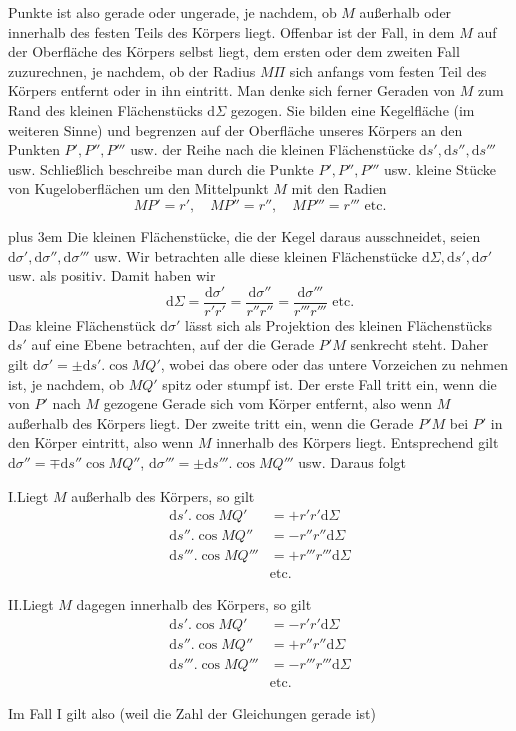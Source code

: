 Punkte ist also gerade oder ungerade, je nachdem, ob $M$ außerhalb oder innerhalb des festen Teils des Körpers liegt. Offenbar ist der Fall, in dem $M$ auf der Oberfläche des Körpers selbst liegt, dem ersten oder dem zweiten Fall zuzurechnen, je nachdem, ob der Radius $M\Pi$ sich anfangs vom festen Teil des Körpers entfernt oder in ihn eintritt. Man denke sich ferner Geraden von $M$ zum Rand des kleinen Flächenstücks $\mathrm{d}\Sigma$ gezogen. Sie bilden eine Kegelfläche (im weiteren Sinne) und begrenzen auf der Oberfläche unseres Körpers an den Punkten $P',P'',P'''$ usw. der Reihe nach die kleinen Flächenstücke $\mathrm{d}s',\mathrm{d}s'',\mathrm{d}s'''$ usw. Schließlich beschreibe man durch die Punkte $P',P'',P'''$ usw. kleine Stücke von Kugeloberflächen um den Mittelpunkt $M$ mit den Radien
\[
MP'=r',\quad MP''=r'',\quad MP'''=r'''\text{ etc.}
\]
{\rightskip=0pt plus 3em Die kleinen Flächenstücke, die der Kegel daraus ausschneidet, seien $\mathrm{d}\sigma',\mathrm{d}\sigma'',\mathrm{d}\sigma'''$ usw. Wir betrachten alle diese kleinen Flächenstücke $\mathrm{d}\Sigma,\mathrm{d}s',\mathrm{d}\sigma'$ usw. als positiv. Damit haben wir
\[
\mathrm{d}\Sigma=\frac{\mathrm{d}\sigma'}{r'r'}=\frac{\mathrm{d}\sigma''}{r''r''}=\frac{\mathrm{d}\sigma'''}{r'''r'''}\text{ etc.}
\]
Das kleine Flächenstück $\mathrm{d}\sigma'$ lässt sich als Projektion des kleinen Flächenstücks $\mathrm{d}s'$ auf eine Ebene betrachten, auf der die Gerade $P'M$ senkrecht steht. Daher gilt $\mathrm{d}\sigma'=\pm\mathrm{d}s'.\cos MQ'$, wobei das obere oder das untere Vorzeichen zu nehmen ist, je nachdem, ob $MQ'$ spitz oder stumpf ist. Der erste Fall tritt ein, wenn die von $P'$ nach $M$ gezogene Gerade sich vom Körper entfernt, also wenn $M$ außerhalb des Körpers liegt. Der zweite tritt ein, wenn die Gerade $P'M$ bei $P'$ in den Körper eintritt, also wenn $M$ innerhalb des Körpers liegt. Entsprechend gilt $\mathrm{d}\sigma''=\mp\mathrm{d}s''\cos MQ''$, $\mathrm{d}\sigma'''=\pm\mathrm{d}s'''.\cos MQ'''$ usw. Daraus folgt
\par}
I.\quad Liegt $M$ außerhalb des Körpers, so gilt
\[
\begin{aligned}
\mathrm{d}s'.\cos MQ'&=+r'r'\mathrm{d}\Sigma\\
\mathrm{d}s''.\cos MQ''&=-r''r''\mathrm{d}\Sigma\\
\mathrm{d}s'''.\cos MQ'''&=+r'''r'''\mathrm{d}\Sigma\\
&\text{etc.}
\end{aligned}
\]
\par
II.\quad Liegt $M$ dagegen innerhalb des Körpers, so gilt
\[
\begin{aligned}
\mathrm{d}s'.\cos MQ'&=-r'r'\mathrm{d}\Sigma\\
\mathrm{d}s''.\cos MQ''&=+r''r''\mathrm{d}\Sigma\\
\mathrm{d}s'''.\cos MQ'''&=-r'''r'''\mathrm{d}\Sigma\\
&\text{etc.}
\end{aligned}
\]
\par
Im Fall I gilt also (weil die Zahl der Gleichungen gerade ist)
